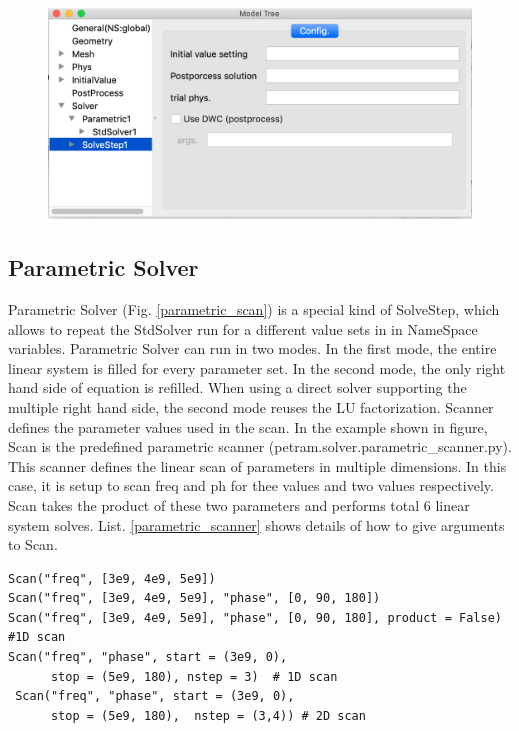 \documentclass[11pt,a4paper,final]{report}
\begin{document}
\begin{figure}
\centering
\includegraphics[width=0.95\columnwidth]{figures/solve_step.png} 
\caption{  }\label{solve_step}
\end{figure}


\subsection{Parametric Solver}
Parametric Solver (Fig. \ref{parametric_scan}) is a special kind of SolveStep, which allows to repeat the StdSolver run for a different value sets in   in NameSpace variables. 
Parametric Solver can run in two modes. In the first mode, the entire linear system is filled for every parameter set.
In the second mode, the only right hand side of equation is refilled. When using a direct solver supporting the multiple
right hand side, the second mode reuses the LU factorization. 
Scanner defines the parameter values used in the scan.  In the example shown in figure, Scan is the predefined parametric scanner (petram.solver.parametric\_scanner.py). 
This scanner defines the linear scan of parameters in multiple dimensions. 
In this case, it is setup to scan freq and ph for thee values and two values respectively. 
Scan takes the product of these two parameters and performs total 6 linear system solves.
List. \ref{parametric_scanner} shows details of how to give arguments to Scan.

\begin{minipage}[c]{0.95\textwidth}
\begin{lstlisting}[caption={Parametric Scanner},captionpos=b, frame=single, label={parametric_scanner}]
Scan("freq", [3e9, 4e9, 5e9])
Scan("freq", [3e9, 4e9, 5e9], "phase", [0, 90, 180])
Scan("freq", [3e9, 4e9, 5e9], "phase", [0, 90, 180], product = False) #1D scan
Scan("freq", "phase", start = (3e9, 0), 
      stop = (5e9, 180), nstep = 3)  # 1D scan 
 Scan("freq", "phase", start = (3e9, 0), 
      stop = (5e9, 180),  nstep = (3,4)) # 2D scan 
\end{lstlisting}
\end{minipage}
\end{document}
